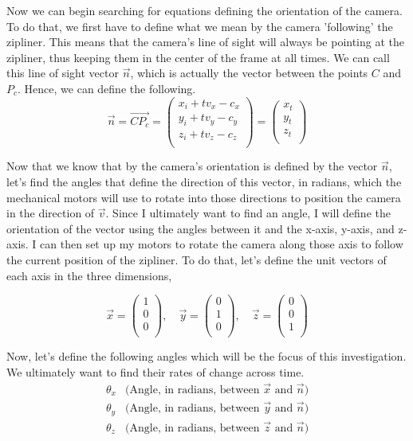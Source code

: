 \documentclass[12pt]{article}
\begin{document}
Now we can begin searching for equations defining the orientation of the camera. To do that, we first have to define what we mean by the camera 'following' the zipliner. This means that the camera's line of sight will always be pointing at the zipliner, thus keeping them in the center of the frame at all times. We can call this line of sight vector $\vec n$, which is actually the vector between the points $C$ and $P_c$. Hence, we can define the following.
$$\vec n = \overrightarrow{CP_c} = \begin{pmatrix} x_i + tv_x - c_x \\ y_i + tv_y - c_y \\ z_i + tv_z - c_z \\
\end{pmatrix} = \begin{pmatrix} x_t \\ y_t \\ z_t \\
\end{pmatrix}$$

Now that we know that by the camera's orientation is defined by the vector $\vec n$, let's find the angles that define the direction of this vector, in radians, which the mechanical motors will use to rotate into those directions to position the camera in the direction of $\vec v$. Since I ultimately want to find an angle, I will define the orientation of the vector using the angles between it and the x-axis, y-axis, and z-axis. I can then set up my motors to rotate the camera along those axis to follow the current position of the zipliner. To do that, let's define the unit vectors of each axis in the three dimensions, 


$$\vec x = \begin{pmatrix} 1 \\ 0 \\ 0 \\
\end{pmatrix}, \quad \vec y = \begin{pmatrix} 0 \\ 1 \\ 0 \\
\end{pmatrix}, \quad \vec z = \begin{pmatrix} 0 \\ 0 \\ 1 \\ \end{pmatrix}$$

Now, let's define the following angles which will be the focus of this investigation. We ultimately want to find their rates of change across time.
$$
\begin{array}{lc}
 \theta_x & \text{(Angle, in radians, between } \vec x \text{ and } \vec n \text{)}\\
 \theta_y & \text{(Angle, in radians, between } \vec y \text{ and } \vec n\text{)}\\
 \theta_z & \text{(Angle, in radians, between } \vec z \text{ and } \vec n\text{)}\\
\end{array}
$$
\end{document}
